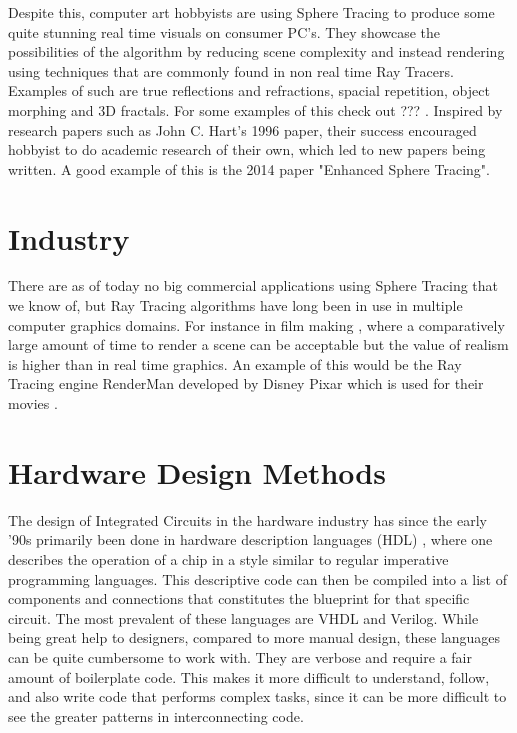 		Despite this, computer art hobbyists are using Sphere Tracing to produce
		some quite stunning real time visuals on consumer PC's. They showcase 
		the possibilities of the algorithm by reducing scene complexity and 
		instead rendering using techniques that are commonly found in non 
		real time Ray Tracers. Examples of such are true reflections and 
		refractions, spacial repetition, object morphing and 3D fractals. 
		For some examples of this check out ???  \cite{InigoQuilez}.
		Inspired by research papers such as John C. Hart's 
		1996 paper\cite{Hart1996}, their success encouraged hobbyist to do 
		academic research of their own, which led to new papers being written. A 
		good example of this is the 2014 paper "Enhanced Sphere 
		Tracing"\cite{Korndorfer2014}.

		\section{ Industry }		
		There are as of today no big commercial applications using Sphere
		Tracing that we know of, but Ray Tracing algorithms have long been in 
		use in multiple computer graphics domains. For instance in film making 
		\cite{TODO}, where a comparatively large amount of time to render a 
		scene can be acceptable but the value of realism is higher than in 
		real time graphics. An example of this would be the Ray Tracing engine 
		RenderMan developed by Disney Pixar which is used for their movies \cite{TODO}.
	
	\section{ Hardware Design Methods } 
	
		The design of Integrated Circuits in the hardware industry has since the early
		'90s primarily been done in hardware description languages (HDL)
		\cite{Chen2012}, where one describes the operation of a chip in a style similar to regular imperative programming languages. This descriptive
		code can then be compiled into a list of components and connections
		that constitutes the blueprint for that specific circuit. The most
		prevalent of these languages are VHDL and Verilog\cite{TODO}. While
		being great help to designers, compared to more manual design, these
		languages can be quite cumbersome to work with. They are verbose and 
		require a fair amount of boilerplate code. This makes it more difficult
		to understand, follow, and also write code that performs complex tasks, 
		since it can be more difficult to see the greater patterns in 
		interconnecting code\cite{TODO}.
		
